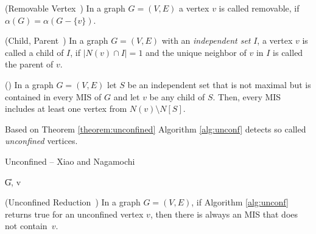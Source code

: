 \documentclass[a4paper,UKenglish,cleveref, autoref, thm-restate]{lipics-v2021}
\begin{document}
\begin{definition} (Removable Vertex~\cite{XiaoNagamochi})
	In a graph $G=(V,E)$ a vertex $v$ is called removable, if 
	$\alpha(G) = \alpha(G-\{v\})$.
\end{definition}

\begin{definition} (Child, Parent~\cite{XiaoNagamochi}) In a graph $G=(V,E)$ with an \textit{independent set} $I$, a vertex $v$ is called a child of $I$, if $|N(v)\cap I| = 1$ and the unique neighbor of $v$ in $I$ is called the parent of $v$.
\end{definition}

\begin{theorem} (\cite{XiaoNagamochi})\label{theorem:unconfined}
	In a graph $G=(V,E)$ let $S$ be an independent set that is not maximal but is contained in every MIS of $G$ and let $v$ be any child of $S$. Then, every MIS includes at least one vertex from $N(v)\setminus N[S]$.
\end{theorem}

Based on Theorem \ref{theorem:unconfined} Algorithm \ref{alg:unconf} detects so called \textit{unconfined} vertices.

\begin{algorithm}
	\caption{Unconfined -- Xiao and Nagamochi \cite{XiaoUnconfined}}\label{alg:unconf}
	\DontPrintSemicolon
	
	\U{G, v}	
	
	
\end{algorithm}


\begin{theorem}(Unconfined Reduction~\cite{XiaoNagamochi}) In a graph $G=(V,E)$,
  if Algorithm \ref{alg:unconf} returns true for an unconfined vertex $v$, then
  there is always an MIS that does not contain~$v$.
\end{theorem}
\end{document}
